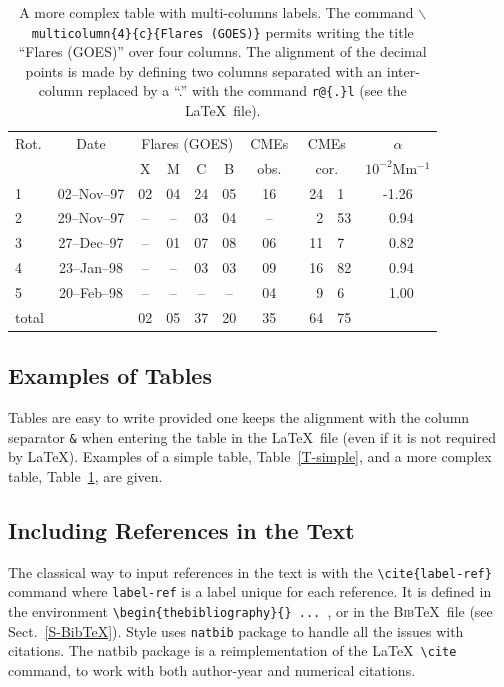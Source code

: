 \documentclass[namedreferences,hyperref,optionalrh]{spr-sola}
\newcommand{\BibTeX}{\textsc{Bib}\TeX}
\begin{document}
\begin{table}
\caption{ A more complex table with multi-columns labels. The command 
\texttt{$\backslash$multicolumn\{4\}\{c\}\{Flares (GOES)\}} permits
writing the title ``Flares (GOES)'' over four columns. The alignment
of the decimal points is made by defining two columns separated with an
inter-column replaced by a ``.'' with the command \texttt{r@\{.\}l}  
(see the \LaTeX\ file).
}
\label{T-complex}
\begin{tabular}{lcccccc r@{.}l c} %
\hline
Rot. & Date & \multicolumn{4}{c}{Flares (GOES)}& CMEs 
     & \multicolumn{2}{c}{CMEs} & $\alpha$ \\
     &      &   X & M & C & B                  & obs. 
     & \multicolumn{2}{c}{cor.} & $10^{-2}$Mm$^{-1}$\\
\hline
1 & 02--Nov--97 & 02 & 04 & 24 & 05 & 16  & ~24&1 & -1.26 \\
2 & 29--Nov--97 & -- & -- & 03 & 04 & --  &   2&53& ~0.94 \\
3 & 27--Dec--97 & -- & 01 & 07 & 08 & 06  &  11&7 & ~0.82 \\
4 & 23--Jan--98 & -- & -- & 03 & 03 & 09  &  16&82& ~0.94 \\
5 & 20--Feb--98 & -- & -- & -- & -- & 04  &   9&6 & ~1.00 \\
total&          & 02 & 05 & 37 & 20 & 35  &  64&75&       \\
\hline
\end{tabular}
\end{table}

\subsection{Examples of Tables} %
\label{S-tables}
   Tables are easy to write provided one keeps the alignment 
with the column separator \texttt{\&} when entering the table 
in the \LaTeX\ file 
(even if it is not required by \LaTeX). Examples of a simple table,
Table~\ref{T-simple}, and a more complex table, Table~\ref{T-complex},
are given.

\subsection{Including References in the Text} %
\label{S-references}
The classical way to input references in the text is with the 
\verb+\cite{label-ref}+ command where \verb+label-ref+ is a label
unique for each reference.  It is defined in the environment
\verb+\begin{thebibliography}{} ... +, or in the \BibTeX\ file
(see Sect.~\ref{S-BibTeX}). 
Style uses \texttt{natbib} package to handle all the issues with citations.
The natbib package is a reimplementation of the \LaTeX\ \verb+\cite+ command, 
to work with both author-year and numerical citations.
\end{document}
